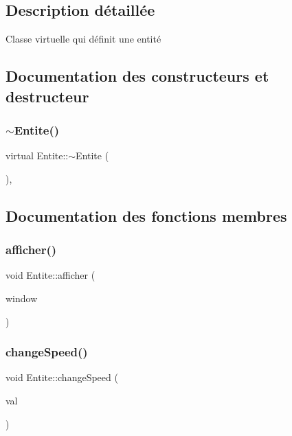 \subsection{Description détaillée}
Classe virtuelle qui définit une entité 

\subsection{Documentation des constructeurs et destructeur}
\mbox{\label{class_entite_ace3b4604920a7aeba25efb60590e64cb}} 
\subsubsection{\texorpdfstring{$\sim$\+Entite()}{~Entite()}}
{\footnotesize\ttfamily virtual Entite\+::$\sim$\+Entite (\begin{DoxyParamCaption}{ }\end{DoxyParamCaption})\hspace{0.3cm}{\ttfamily [virtual]}, {\ttfamily [default]}}



\subsection{Documentation des fonctions membres}
\mbox{\label{class_entite_ad80a88f81ccc689b9abdfa75bd1e99d6}} 
\subsubsection{\texorpdfstring{afficher()}{afficher()}}
{\footnotesize\ttfamily void Entite\+::afficher (\begin{DoxyParamCaption}\item[{sf\+::\+Render\+Window \&}]{window }\end{DoxyParamCaption})}

\mbox{\label{class_entite_a88c148848289e34ca3bc991c37db9b44}} 
\subsubsection{\texorpdfstring{change\+Speed()}{changeSpeed()}}
{\footnotesize\ttfamily void Entite\+::change\+Speed (\begin{DoxyParamCaption}\item[{int}]{val }\end{DoxyParamCaption})}

